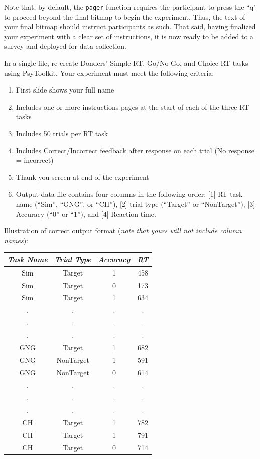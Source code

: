 Note that, by default, the \texttt{pager} function requires the participant to press the ``q" to proceed beyond the final bitmap to begin the experiment.  Thus, the text of your final bitmap should instruct participants as such.  That said, having finalized your experiment with a clear set of instructions, it is now ready to be added to a survey and deployed for data collection.
\clearpage

\begin{tcolorbox}[width=\textwidth,colback=blue!5!white,colframe=blue!50!black,
  colbacktitle=blue!75!black,title=\Huge{PsyToolkit Assignment}]
  In a single file, re-create Donders' Simple RT, Go/No-Go, and Choice RT tasks using PsyToolkit.  Your experiment must meet the following criteria:
  \begin{enumerate}
      \item First slide shows your full name
      \item Includes one or more instructions pages at the start of each of the three RT tasks
      \item Includes 50 trials per RT task
      \item Includes Correct/Incorrect feedback after response on each trial (No response = incorrect)
      \item Thank you screen at end of the experiment
      \item Output data file contains four columns in the following order: [1] RT task name (``Sim'', ``GNG'', or ``CH''), [2] trial type (``Target'' or ``NonTarget''), [3] Accuracy (``0'' or ``1''), and [4] Reaction time. 
  \end{enumerate}
  \tcblower
  Illustration of correct output format (\emph{note that yours will not include column names}):
  \begin{center}
  \begin{tabular}{c c c c}
  \emph{Task Name} & \emph{Trial Type} & \emph{Accuracy} & \emph{RT}\\
  \hline
  \hline
  Sim & Target & 1 & 458\\
  Sim & Target & 0 & 173\\
  Sim & Target & 1 & 634\\
  . & . & . & .\\
  . & . & . & .\\
  . & . & . & .\\
  GNG & Target & 1 & 682\\
  GNG & NonTarget & 1 & 591\\
  GNG & NonTarget & 0 & 614\\
  . & . & . & .\\
  . & . & . & .\\
  . & . & . & .\\
  CH & Target & 1 & 782\\
  CH & Target & 1 & 791\\
  CH & Target & 0 & 714\\
  \end{tabular}
  \end{center}
\end{tcolorbox}
\printglossary[type=datacollection,style=twocolumn]
\newpage

\renewcommand{\bibname}{References}

